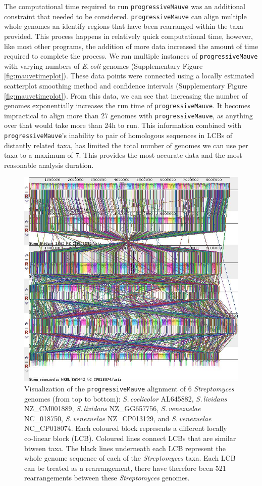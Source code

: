 \documentclass[11pt]{article}
\newcommand{\strep}{\textit{Streptomyces}\xspace}
\newcommand{\ecol}{\textit{E.\,coli}\xspace}
\newcommand{\p}{\texttt{progressiveMauve}\xspace}
\newcommand{\sliv}{\textit{S.\,lividans}\xspace}
\newcommand{\sven}{\textit{S.\,venezuelae}\xspace}
\newcommand{\scoe}{\textit{S.\,coelicolor}\xspace}
\begin{document}
The computational time required to run \p was an additional constraint that needed to be considered.
\p can align multiple whole genomes an identify regions that have been rearranged within the taxa provided.
This process happens in relatively quick computational time, however, like most other programs, the addition of more data increased the amount of time required to complete the process.
We ran multiple instances of \p with varying numbers of \ecol genomes (Supplementary Figure \ref{fig:mauvetimeplot}).
These data points were connected using a locally estimated scatterplot smoothing method and confidence intervals (Supplementary Figure \ref{fig:mauvetimeplot}).
From this data, we can see that increasing the number of genomes exponentially increases the run time of \p.
It becomes impractical to align more than 27 genomes with \p, as anything over that would take more than 24h to run.
This information combined with \p's inability to pair of homologous sequences in LCBs of distantly related taxa, has limited the total number of genomes we can use per taxa to a maximum of 7.
This provides the most accurate data and the most reasonable analysis duration.

	\begin{figure}[H]
	\begin{center}
		\includegraphics[width=\textwidth]{./figs/6_strep_strains_mauve_aln_pic}
		\caption{\label{fig:strep6mauvealn} Visualization of the \p alignment of 6 \strep genomes (from top to bottom): \scoe AL645882, \sliv NZ\_CM001889, \sliv NZ\_GG657756, \sven NC\_018750, \sven NZ\_CP013129, and \sven NC\_CP018074. Each coloured block represents a different locally co-linear block (LCB). Coloured lines connect LCBs that are similar btween taxa. The black lines underneath each LCB represent the whole genome sequence of each of the \strep taxa. Each LCB can be treated as a rearrangement, there have therefore been 521 rearrangements between these \strep genomes.}
	\end{center}
\end{figure}
\end{document}

